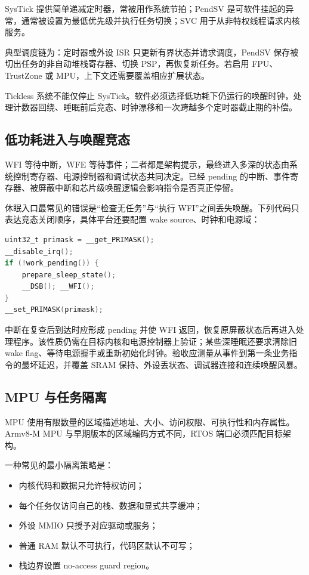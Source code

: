 SysTick 提供简单递减定时器，常被用作系统节拍；PendSV 是可软件挂起的异常，通常被设置为最低优先级并执行任务切换；SVC 用于从非特权线程请求内核服务。

典型调度链为：定时器或外设 ISR 只更新有界状态并请求调度，PendSV 保存被切出任务的非自动堆栈寄存器、切换 PSP，再恢复新任务。若启用 FPU、TrustZone 或 MPU，上下文还需要覆盖相应扩展状态。

Tickless 系统不能仅停止 SysTick。软件必须选择低功耗下仍运行的唤醒时钟，处理计数器回绕、睡眠前后竞态、时钟漂移和一次跨越多个定时器截止期的补偿。

\subsection{低功耗进入与唤醒竞态}

WFI 等待中断，WFE 等待事件；二者都是架构提示，最终进入多深的状态由系统控制寄存器、电源控制器和调试状态共同决定。已经 pending 的中断、事件寄存器、被屏蔽中断和芯片级唤醒逻辑会影响指令是否真正停留。

休眠入口最常见的错误是“检查无任务”与“执行 WFI”之间丢失唤醒。下列代码只表达竞态关闭顺序，具体平台还要配置 wake source、时钟和电源域：
\begin{lstlisting}[language=C,caption={带状态复查的休眠入口示意}]
uint32_t primask = __get_PRIMASK();
__disable_irq();
if (!work_pending()) {
    prepare_sleep_state();
    __DSB(); __WFI();
}
__set_PRIMASK(primask);
\end{lstlisting}

中断在复查后到达时应形成 pending 并使 WFI 返回，恢复原屏蔽状态后再进入处理程序。该性质仍需在目标内核和电源控制器上验证；某些深睡眠还要求清除旧 wake flag、等待电源握手或重新初始化时钟。验收应测量从事件到第一条业务指令的最坏延迟，并覆盖 SRAM 保持、外设丢状态、调试器连接和连续唤醒风暴。

\subsection{MPU 与任务隔离}

MPU 使用有限数量的区域描述地址、大小、访问权限、可执行性和内存属性。Armv8-M MPU 与早期版本的区域编码方式不同，RTOS 端口必须匹配目标架构。

一种常见的最小隔离策略是：
\begin{itemize}
  \item 内核代码和数据只允许特权访问；
  \item 每个任务仅访问自己的栈、数据和显式共享缓冲；
  \item 外设 MMIO 只授予对应驱动或服务；
  \item 普通 RAM 默认不可执行，代码区默认不可写；
  \item 栈边界设置 no-access guard region。
\end{itemize}

